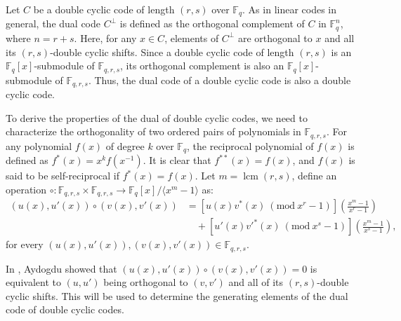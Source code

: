 \documentclass[12pt]{article}
\newcommand{\Mod}[1]{\ (\mathrm{mod}\ #1)}
\begin{document}
	Let $C$ be a double cyclic code of length $(r,s)$ over $\mathbb{F}_q$.
	As in linear codes in general, the dual code $C^{\perp}$ is defined as the orthogonal complement of $C$ in $\mathbb{F}_q^n$, where $n=r+s$. Here, for any $x\in C$, elements of $C^{\perp}$ are orthogonal to $x$ and all its $(r,s)$-double cyclic shifts. Since a double cyclic code of length $(r,s)$ is an $\mathbb{F}_q[x]$-submodule of $\mathbb{F}_{q,r,s}$, its orthogonal complement is also an $\mathbb{F}_q[x]$-submodule of $\mathbb{F}_{q,r,s}$. Thus, the dual code of a double cyclic code is also a double cyclic code.
	
	To derive the properties of the dual of double cyclic codes, we need to characterize the orthogonality of two ordered pairs of polynomials in $\mathbb{F}_{q,r,s}$. For any polynomial $f(x)$ of degree $k$ over $\mathbb{F}_q$, the reciprocal polynomial of $f(x)$ is defined as $f^{*}(x)= x^{k} f(x^{-1})$. It is clear that $f^{**}(x)=f(x)$, and $f(x)$ is said to be self-reciprocal if $f^{*}(x)=f(x)$. Let $m=\operatorname{lcm}(r,s)$, define an operation $\circ:\mathbb{F}_{q,r,s}\times \mathbb{F}_{q,r,s} \rightarrow \mathbb{F}_q[x]/\langle x^m -1\rangle$ as:
	\begin{align*}
		(u(x),u'(x))\circ (v(x),v'(x)) & =\left[u(x) v^{*}(x) \Mod{x^r-1}\right]\left(\frac{x^m-1}{x^r-1}\right) \\
		&\quad + \left[u'(x) v'^{*}(x)\Mod{x^s -1}\right]\left(\frac{x^m-1}{x^s-1}\right),
	\end{align*}
	for every $(u(x),u'(x)),(v(x),v'(x))\in \mathbb{F}_{q,r,s}$.
	
	In \cite{Aydogdu2024}, Aydogdu showed that $(u(x),u'(x))\circ (v(x),v'(x))=0$ is equivalent to $(u,u')$ being orthogonal to $(v,v')$ and all of its $(r,s)$-double cyclic shifts. This will be used to determine the generating elements of the dual code of double cyclic codes.
	
\end{document}
